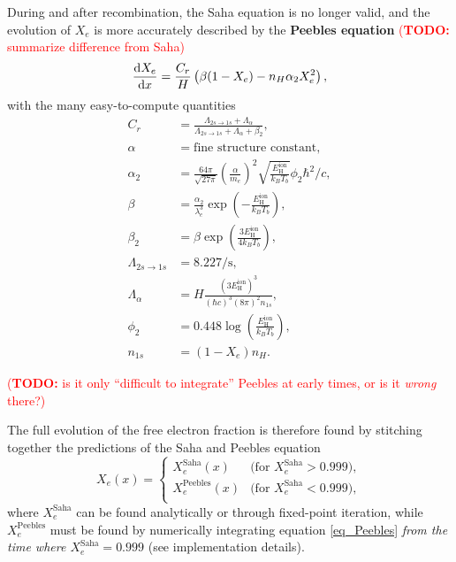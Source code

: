\documentclass[10pt,a4paper]{article}
\newcommand\TODO[1]{\textcolor{red}{(\textbf{TODO:} #1)}}
\begin{document}
During and after recombination, the Saha equation is no longer valid,
and the evolution of $X_e$ is more accurately described by the \textbf{Peebles equation}
\TODO{summarize difference from Saha}
\begin{equation}
	\odv{X_e}{x} = \frac{C_r}{H} \left( \beta (1-X_e) - n_H \alpha_2 X_e^2 \right),
\label{eq_Peebles}
\end{equation}
with the many easy-to-compute quantities
\begin{subequations}
\begin{align}
	C_r &= \frac{\Lambda_{2s \rightarrow 1s} + \Lambda_\alpha}{\Lambda_{2s \rightarrow 1s} + \Lambda_\alpha + \beta_2}, \\
	\alpha &= \text{fine structure constant}, \\
	\alpha_2 &= \frac{64 \pi}{\sqrt{27 \pi}} \left(\frac{\alpha}{m_e}\right)^2 \sqrt{\frac{E^\text{ion}_\text{H}}{k_B T_b}} \phi_2 \hbar^2/c, \\
	\beta &= \frac{\alpha_2}{\lambda_e^3} \exp \left(-\frac{E^\text{ion}_\text{H}}{k_B T_b}\right), \\
	\beta_2 &= \beta \exp \left(\frac{3 E^\text{ion}_\text{H}}{4 k_B T_b}\right), \\
	\Lambda_{2s \rightarrow 1s} &= 8.227 / \mathrm{s}, \\
	\Lambda_\alpha &= H \frac{(3 E^\text{ion}_{\text{H}})^3}{(\hbar c)^3 (8 \pi)^2 n_{1s}}, \\
	\phi_2 &= 0.448 \log \left( \frac{E^\text{ion}_\text{H}}{k_B T_b} \right), \\
	n_{1s} &= (1-X_e) n_H.
\end{align}
\end{subequations}

\TODO{is it only ``difficult to integrate'' Peebles at early times, or is it \emph{wrong} there?}

The full evolution of the free electron fraction is therefore found by stitching together the predictions of the Saha and Peebles equation
\begin{equation}
	X_e(x) = \begin{cases}
	             X_e^\text{Saha}(x) & \text{(for $X_e^\text{Saha} > 0.999$)}, \\
	             X_e^\text{Peebles}(x) & \text{(for $X_e^\text{Saha} < 0.999$)}, \\
	         \end{cases}
\label{eq_free_electron_fraction}
\end{equation}
where $X_e^\text{Saha}$ can be found analytically or through fixed-point iteration,
while $X_e^\text{Peebles}$ must be found by numerically integrating equation \eqref{eq_Peebles}
\emph{from the time where $X_e^\text{Saha} = 0.999$} (see implementation details).
\end{document}

